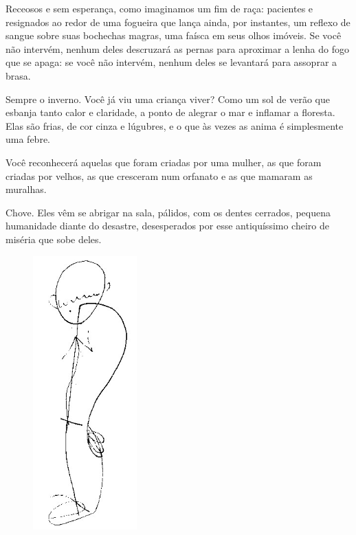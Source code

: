 \bigskip
\bigskip


Receosos e sem esperança, como imaginamos um fim de raça: pacientes e
resignados ao redor de uma fogueira que lança ainda, por instantes, um
reflexo de sangue sobre suas bochechas magras, uma faísca em seus olhos
imóveis. Se você não intervém, nenhum deles descruzará as pernas para
aproximar a lenha do fogo que se apaga: se você não intervém, nenhum
deles se levantará para assoprar a brasa.

\bigskip
\bigskip


Sempre o inverno. Você já viu uma criança viver? Como um sol de verão
que esbanja tanto calor e claridade, a ponto de alegrar o mar e inflamar
a floresta. Elas são frias, de cor cinza e lúgubres, e o que às vezes as
anima é simplesmente uma febre.

\bigskip
\bigskip

Você reconhecerá aquelas que foram criadas por uma mulher, as que foram
criadas por velhos, as que cresceram num orfanato e as que mamaram as
muralhas.

\bigskip
\bigskip

Chove. Eles vêm se abrigar na sala, pálidos, com os dentes cerrados,
pequena humanidade diante do desastre, desesperados por esse
antiquíssimo cheiro de miséria que sobe deles.

\bigskip
\bigskip

\begin{figure}
  \includegraphics[width=40mm]{./imgs/Image_4.jpg}
 \end{figure}


